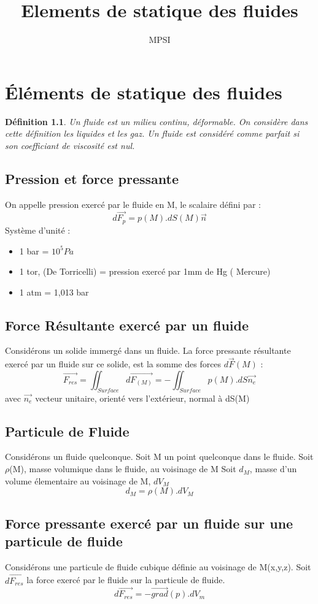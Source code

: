 \documentclass[a4paper,12 pt,oneside]{report}     %
\title{Elements de statique des fluides}
\author{MPSI}
\newtheorem{de}{Définition}
\begin{document}
\maketitle
\tableofcontents

\chapter{Éléments de statique des fluides}
\begin{de}
Un fluide est un milieu continu, déformable. On considère dans cette définition les liquides et les gaz. Un fluide est considéré comme parfait si son coefficiant de viscosité est nul.
\end{de}
\section{Pression et force pressante}
On appelle pression exercé par le fluide en M, le scalaire défini par :
$$d\overrightarrow{F_{p}} = p(M).dS(M)\overrightarrow{n}$$
Système d'unité :
\begin{itemize}
 \item 1 bar = $10^{5} Pa$
 \item 1 tor, (De Torricelli) = pression exercé par 1mm de Hg ( Mercure)
 \item 1 atm = 1,013 bar
\end{itemize}
\section{Force Résultante exercé par un fluide}
Considérons un solide immergé dans un fluide.
La force pressante résultante exercé par un fluide sur ce solide, est la somme des forces $d\overrightarrow{F}(M)$ :
$$\overrightarrow{F_{res}} = \iint_{Surface} d\overrightarrow{F_{(M)}} = - \iint_{Surface} p(M).dS\overrightarrow{n_{e}}$$
avec $\overrightarrow{n_e}$ vecteur unitaire, orienté vers l'extérieur, normal à dS(M)
\section{Particule de Fluide}
Considérons un fluide quelconque. Soit M un point quelconque dans le fluide.
Soit $\rho$(M), masse volumique dans le fluide, au voisinage de M
Soit $d_M$, masse d'un volume élementaire au voisinage de M, $dV_M$
$$d_M = \rho(M).dV_M$$
\section{Force pressante exercé par un fluide sur une particule de fluide}
Considérons une particule de fluide cubique définie au voisinage de M(x,y,z).
Soit $d\overrightarrow{F_{res}}$ la force exercé par le fluide sur la particule de fluide.
$$d\overrightarrow{F_{res}} = -\overrightarrow{grad}(p).dV_m$$
\end{document}
